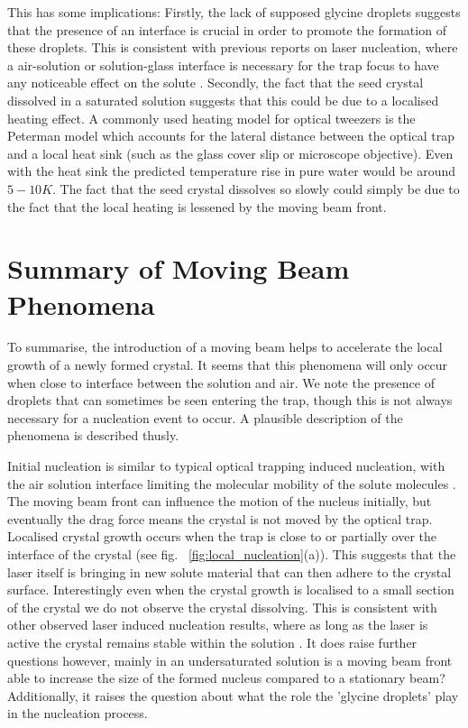 This has some implications: Firstly, the lack of supposed 
glycine droplets suggests that the presence of an interface 
is crucial in order to promote the formation of these droplets. 
This is consistent with previous reports on laser nucleation, 
where a air-solution or solution-glass interface is necessary 
for the trap focus to have any noticeable effect on the solute \cite{Gowayed2021, Liao2022, Rungsimanon2010}. Secondly, the 
fact that the seed crystal dissolved in a saturated solution 
suggests that this could be due to a localised heating effect. 
A commonly used heating model for optical tweezers is the 
Peterman model \cite{Peterman2003} which accounts for the lateral 
distance between the optical trap and a local heat sink (such 
as the glass cover slip or microscope objective). Even with 
the heat sink the predicted temperature rise in pure water would 
be around $5-10 K$.  The fact that the seed crystal dissolves 
so slowly could simply be due to the fact that the local heating 
is lessened by the moving beam front.
 
\section{Summary of Moving Beam Phenomena}
To summarise, the introduction of a moving beam helps to 
accelerate the local growth of a newly formed crystal. It 
seems that this phenomena will only occur when close to 
interface between the solution and air. We note the presence
of droplets that can sometimes be seen entering the trap, 
though this is not always necessary for a nucleation event 
to occur. A plausible description of the phenomena is described
thusly. 

Initial nucleation is similar to typical optical trapping 
induced nucleation, with the air solution interface limiting 
the molecular mobility of the solute molecules \cite{Liao2022, 
Sugiyama2009, Gowayed2021}. The moving beam front can influence 
the motion of the nucleus initially, but eventually the drag 
force means the crystal is not moved by the optical trap. 
Localised crystal growth occurs when the trap is close to or 
partially over the interface of the crystal (see fig.~
\ref{fig:local_nucleation}(a)). This suggests that the 
laser itself is bringing in new solute material that can then
adhere to the crystal surface. Interestingly even when the 
crystal growth is localised to a small section of the crystal
we do not observe the crystal dissolving. This is consistent 
with other observed laser induced nucleation results, where 
as long as the laser is active the crystal remains stable 
within the solution \cite{Flannigan2023, Rungsimanon2010,
Liao2022, Sugiyama2009}. It does raise further questions 
however, mainly in an undersaturated solution is a moving 
beam front able to increase the size of the formed nucleus
compared to a stationary beam? Additionally, it raises the 
question about what the role the 'glycine droplets' play in 
the nucleation process.

